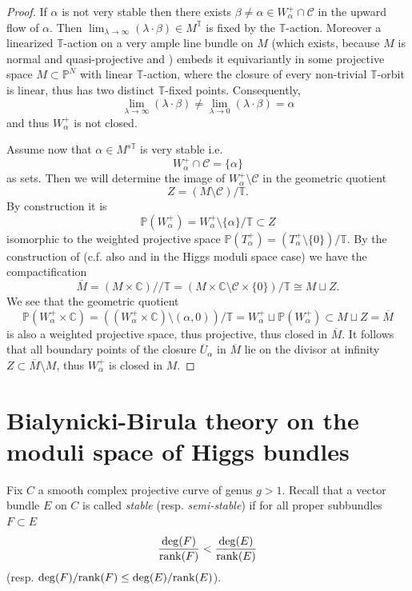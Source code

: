 \documentclass[12pt]{article}
\numberwithin{equation}{section}
\theoremstyle{remark}
\theoremstyle{definition}
\numberwithin{theorem}{section}
\def\beq{\begin{eqnarray}}
\def\eeq{\end{eqnarray}}
\def\C{\mathbb{C}}
\def\P{\mathbb{P}}
\newcommand{\T}{{\mathbb{T}}}
\def\calC{{\mathcal C}}
\renewcommand{\1}{\mathbbm{1}}
\begin{document}
\begin{proof}If $\alpha$ is not very stable then there exists  $\beta\neq\alpha \in W^+_\alpha\cap \calC$  in the upward flow of $
	\alpha$. Then $\lim_{\lambda\to \infty}(\lambda\cdot \beta)\in M^\T$ is fixed by the $\T$-action. Moreover a linearized $\T$-action on a very ample line bundle on $M$ (which exists, because $M$ is normal and quasi-projective and \cite[Corollary 7.2]{dolgachev}) embeds it equivariantly in some projective space $M\subset {\mathbb P}^N$ with linear $\T$-action, where the closure of every non-trivial $\T$-orbit is linear, thus has two distinct $\T$-fixed points. Consequently, $$\lim_{\lambda\to \infty}(\lambda\cdot \beta)\neq\lim_{\lambda\to 0}(\lambda\cdot \beta)=\alpha$$and thus $W^+_\alpha$ is not closed.
	
	Assume now that $\alpha\in M^{s\T}$ is very stable i.e. $$W^+_{\alpha}\cap \calC=\{\alpha\}$$ as sets.  Then we will determine the image of  $W^+_\alpha\setminus \calC$ in the geometric quotient $$Z=(M\setminus \calC)/\T.$$ By construction it is $$\P(W^+_\alpha)=W^+_\alpha\setminus \{\alpha\}/\T\subset Z$$  isomorphic to the  weighted projective space $\P(T_\alpha^+)=(T_\alpha^+\setminus \{0\})/\T$. By the construction of
	\cite[(1.2.3)]{hausel-large} (c.f. also \cite[\S 11]{simpson3} and \cite{hausel-compact} in the Higgs moduli space case) we have the compactification $$\overline{M}=(M\times\C)/\! /\T=\left(M\times\C\setminus \calC\times\{0\}\right)/\T\cong M\sqcup Z.$$ We 
	see that the geometric quotient $$\P(W^+_\alpha\times \C)= \left((W^+_\alpha\times \C)\setminus (\alpha,0)\right)/\T= W^+_\alpha\sqcup \P(W^+_\alpha) \subset M\sqcup Z = \overline{M}$$ is also a weighted projective space, thus projective, thus closed in $\overline{M}$. It follows that all boundary points of the closure $\overline{U}_\alpha$ in $\overline{M}$ lie on the divisor at infinity $Z\subset \overline{M}\setminus M$, thus $W^+_\alpha$ is closed in $M$. 
\end{proof}

 
 \section{Bialynicki-Birula theory on the moduli space of Higgs bundles}
 \label{bbhiggs}


Fix $C$ a smooth complex projective curve of genus $g>1$.
Recall that a vector bundle $E$ on $C$ is called 
{\em stable} (resp. {\em semi-stable}) %
if for all proper subbundles $F\subset E$ \beq \label{stable}{\deg(F)\over {\rm rank}(F)}
< {\deg(E)\over {\rm rank}(E)}\eeq (resp. ${\deg(F)/ {\rm rank}(F)}
\leq {\deg(E)/ {\rm rank}(E)}$).
\end{document}
